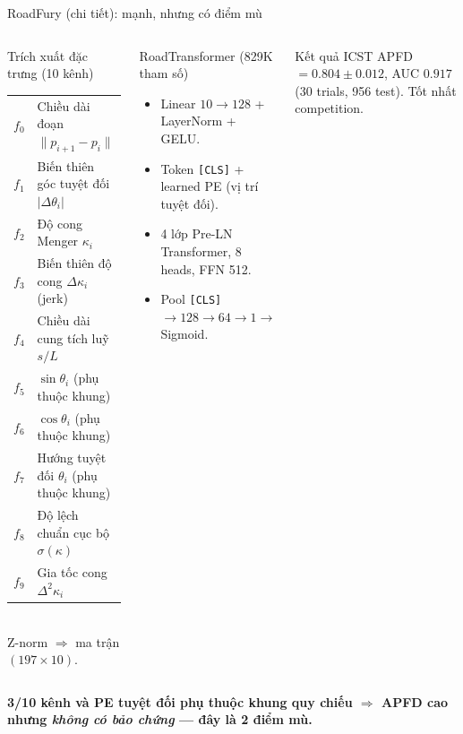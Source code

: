 \documentclass[aspectratio=169,10pt]{beamer}
\newcommand{\takeaway}[1]{%
  \vspace{0.3em}%
  \begin{mdframed}[linecolor=mLightBrown,linewidth=1.2pt,
    backgroundcolor=mLightBrown!8,
    innertopmargin=4pt,innerbottommargin=4pt,
    innerleftmargin=8pt,innerrightmargin=8pt,roundcorner=2pt]
  \centering\footnotesize\bfseries\color{mDarkTeal} #1
  \end{mdframed}}
\begin{document}
\begin{frame}{RoadFury (chi tiết): mạnh, nhưng có điểm mù}
\begin{columns}[T]
\begin{block}{Trích xuất đặc trưng (10 kênh)}
\scriptsize
\setlength{\tabcolsep}{3pt}
\begin{tabular}{@{}ll@{}}
$f_0$ & Chiều dài đoạn $\lVert p_{i+1}{-}p_i\rVert$ \\
$f_1$ & Biến thiên góc tuyệt đối $|\Delta\theta_i|$ \\
$f_2$ & Độ cong Menger $\kappa_i$ \\
$f_3$ & Biến thiên độ cong $\Delta\kappa_i$ (jerk) \\
$f_4$ & Chiều dài cung tích luỹ $s/L$ \\
\rowcolor{cRotL} $f_5$ & $\sin\theta_i$ \textcolor{alert}{(phụ thuộc khung)} \\
\rowcolor{cRotL} $f_6$ & $\cos\theta_i$ \textcolor{alert}{(phụ thuộc khung)} \\
\rowcolor{cRotL} $f_7$ & Hướng tuyệt đối $\theta_i$ \textcolor{alert}{(phụ thuộc khung)} \\
$f_8$ & Độ lệch chuẩn cục bộ $\sigma(\kappa)$ \\
$f_9$ & Gia tốc cong $\Delta^2\kappa_i$ \\
\end{tabular}\\[2pt]
Z-norm $\Rightarrow$ ma trận $(197\times 10)$.
\end{block}

\begin{block}{RoadTransformer (829K tham số)}
\scriptsize
\begin{itemize}\setlength{\itemsep}{1pt}
  \item Linear $10\!\to\!128$ + LayerNorm + GELU.
  \item Token \texttt{[CLS]} + learned PE \textcolor{alert}{(vị trí tuyệt đối)}.
  \item 4 lớp Pre-LN Transformer, 8 heads, FFN 512.
  \item Pool \texttt{[CLS]} $\to 128\!\to\!64\!\to\!1\to$ Sigmoid.
\end{itemize}
\end{block}

\begin{exampleblock}{Kết quả ICST}
\scriptsize
APFD $=\mathbf{0.804\pm 0.012}$, AUC $0.917$ (30 trials, 956 test). Tốt nhất competition.
\end{exampleblock}
\end{columns}

\takeaway{3/10 kênh và PE tuyệt đối phụ thuộc khung quy chiếu $\Rightarrow$ APFD cao nhưng \emph{không có bảo chứng} — đây là 2 điểm mù.}
\end{frame}
\end{document}
